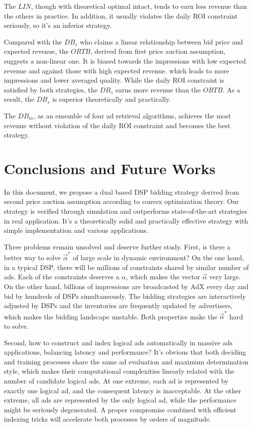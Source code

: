 \documentclass[sigconf]{acmart}
\newcommand{\valpha}{\vec{\alpha}}
\begin{document}
The $LIN$, though with theoretical optimal intact, tends to earn less revenue than the others in practice.
In addition, it usually violates the daily ROI constraint seriously, so it's an inferior strategy.

Compared with the $DB_s$ who claims a linear relationship between bid price and expected revenue,
    the $ORTB$, derived from first price auction assumption, suggests a non-linear one.
It is biased towards the impressions with low expected revenue and against those with high expected revenue.
    which leads to more impressions and lower averaged quality.
While the daily ROI constraint is satisfied by both strategies,
    the $DB_s$ earns more revenue than the $ORTB$. As a result, the $DB_s$ is superior theoretically and practically.

The $DB_m$, as an ensemble of four ad retrieval algorithms,
    achieves the most revenue without violation of the daily ROI constraint and becomes the best strategy.

\section{Conclusions and Future Works}

In this document, we propose a dual based DSP bidding strategy
    derived from second price auction assumption according to convex optimization theory.
Our strategy is verified through simulation and outperforms state-of-the-art strategies in real application.
It's a theoretically solid and practically effective strategy with simple implementation and various applications.

Three problems remain unsolved and deserve further study.
First, is there a better way to solve $\valpha^*$ of large scale in dynamic environment?
On the one hand, in a typical DSP, there will be millions of constraints shared by similar number of ads.
Each of the constraints deserves a $\alpha$, which makes the vector $\valpha$ very large.
On the other hand, billions of impressions are broadcasted by AdX every day and bid by hundreds of DSPs simultaneously.
The bidding strategies are interactively adjusted by DSPs and the inventories are frequently updated by advertisers,
    which makes the bidding landscape unstable.
Both properties make the $\valpha^*$ hard to solve.

Second, how to construct and index logical ads automatically in massive ads applications, balancing latency and performance?
It's obvious that both deciding and training processes share the same ad evaluation and maximum determination style,
    which makes their computational complexities linearly related with the number of candidate logical ads.
At one extreme, each ad is represented by exactly one logical ad, and the consequent latency is inacceptable.
At the other extreme, all ads are represented by the only logical ad, while the performance might be seriously degenerated.
A proper compromise combined with efficient indexing tricks will accelerate both processes by orders of magnitude.
\end{document}
